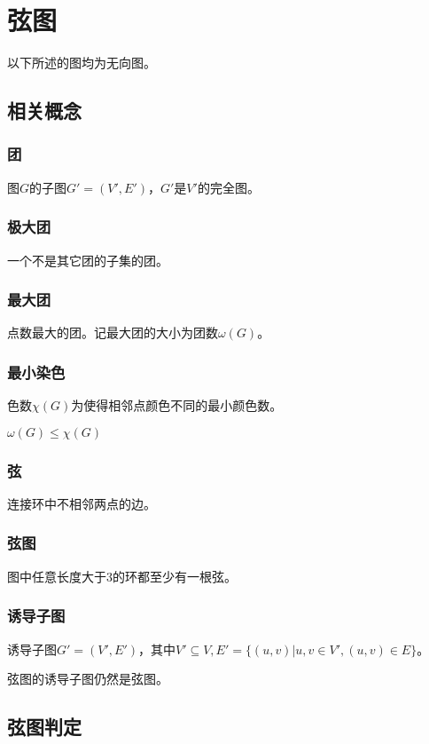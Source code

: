 \section{弦图}
以下所述的图均为无向图。
\subsection{相关概念}
\subsubsection{团}
图$G$的子图$G'=(V',E')$，$G'$是$V'$的完全图。
\subsubsection{极大团}
一个不是其它团的子集的团。
\subsubsection{最大团}
点数最大的团。记最大团的大小为团数$\omega(G)$。
\subsubsection{最小染色}
色数$\chi(G)$为使得相邻点颜色不同的最小颜色数。

\begin{lemma}
    $\omega(G)\leq \chi(G)$
\end{lemma}
\subsubsection{弦}
连接环中不相邻两点的边。
\subsubsection{弦图}
图中任意长度大于3的环都至少有一根弦。
\subsubsection{诱导子图}
诱导子图$G'=(V',E')$，其中$V'\subseteq V,E'=\{(u,v)|u,v\in V',(u,v)\in E\}$。
\begin{lemma}
    弦图的诱导子图仍然是弦图。
\end{lemma}
\subsection{弦图判定}
